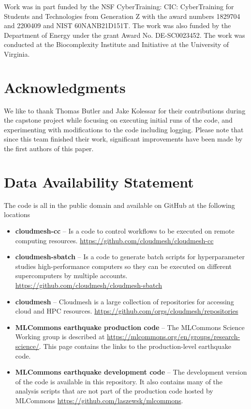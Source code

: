 \documentclass[utf8]{FrontiersinVancouver} %
\begin{document}
Work was in part funded by the NSF CyberTraining: CIC: CyberTraining
for Students and Technologies from Generation Z with the award numbers
1829704 and 2200409 and NIST 60NANB21D151T.  The work was also funded
by the Department of Energy under the grant Award
No. DE-SC0023452. The work was conducted at the Biocomplexity
Institute and Initiative at the University of Virginia.

\section*{Acknowledgments}

We like to thank Thomas Butler and Jake Kolessar for their
contributions during the capstone project while focusing on executing
initial runs of the code, and experimenting with modifications to the
code including logging. Please note that since this team finished
their work, significant improvements have been made by the first authors of
this paper.



\section*{Data Availability Statement}

The code is all in the public domain and available on GitHub at the following locations

\begin{itemize}

\item {\bf cloudmesh-cc} -- Is a code to control workflows to be executed on
  remote computing
  resources. \url{https://github.com/cloudmesh/cloudmesh-cc}

\item {\bf cloudmesh-sbatch} -- Is a code to generate batch scripts for
  hyperparameter studies high-performance computers so they can be
  executed on different supercomputers by multiple
  accounts. \url{https://github.com/cloudmesh/cloudmesh-sbatch}

\item {\bf cloudmesh} -- Cloudmesh is a large collection of repositories for
  accessing cloud and HPC
  resources. \url{https://github.com/orgs/cloudmesh/repositories}

\item {\bf MLCommons earthquake production code} -- The MLCommons Science
  Working group is described at
  \url{https://mlcommons.org/en/groups/research-science/}. This page
  contains the links to the production-level earthquake code.

\item {\bf MLCommons earthquake development code} -- The development version of
  the code is available in this repository. It also contains many of
  the analysis scripts that are not part of the production code
  hosted by MLCommons \url{https://github.com/laszewsk/mlcommons}.

\end{itemize}
\end{document}
